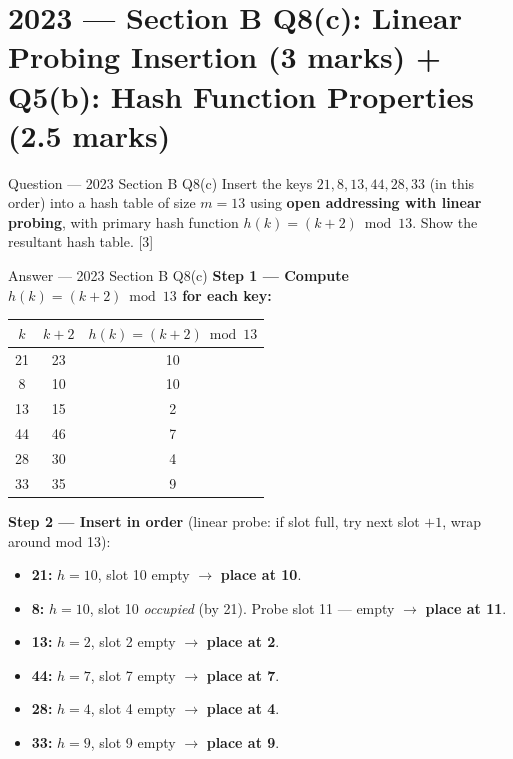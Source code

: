 \documentclass[12pt,a4paper]{article}
\begin{document}
\newpage
\section{2023 --- Section B Q8(c): Linear Probing Insertion (3 marks) + Q5(b): Hash Function Properties (2.5 marks)}

\begin{qbox}{Question --- 2023 Section B Q8(c)}
Insert the keys $21, 8, 13, 44, 28, 33$ (in this order) into a hash table of size $m=13$ using \textbf{open addressing with linear probing}, with primary hash function $h(k) = (k+2) \bmod 13$. Show the resultant hash table. \hfill [3]
\end{qbox}

\begin{solbox}{Answer --- 2023 Section B Q8(c)}
\textbf{Step 1 --- Compute $h(k) = (k+2)\bmod 13$ for each key:}
\begin{center}
\renewcommand{\arraystretch}{1.2}
\begin{tabular}{c|c|c}
\toprule
$k$ & $k+2$ & $h(k)=(k+2)\bmod 13$ \\
\midrule
21 & 23 & 10 \\
8  & 10 & 10 \\
13 & 15 & 2 \\
44 & 46 & 7 \\
28 & 30 & 4 \\
33 & 35 & 9 \\
\bottomrule
\end{tabular}
\end{center}

\textbf{Step 2 --- Insert in order} (linear probe: if slot full, try next slot $+1$, wrap around mod 13):
\begin{itemize}[noitemsep]
  \item \textbf{21:} $h=10$, slot 10 empty $\to$ \textbf{place at 10}.
  \item \textbf{8:} $h=10$, slot 10 \emph{occupied} (by 21). Probe slot 11 --- empty $\to$ \textbf{place at 11}.
  \item \textbf{13:} $h=2$, slot 2 empty $\to$ \textbf{place at 2}.
  \item \textbf{44:} $h=7$, slot 7 empty $\to$ \textbf{place at 7}.
  \item \textbf{28:} $h=4$, slot 4 empty $\to$ \textbf{place at 4}.
  \item \textbf{33:} $h=9$, slot 9 empty $\to$ \textbf{place at 9}.
\end{itemize}


\end{solbox}
\end{document}
